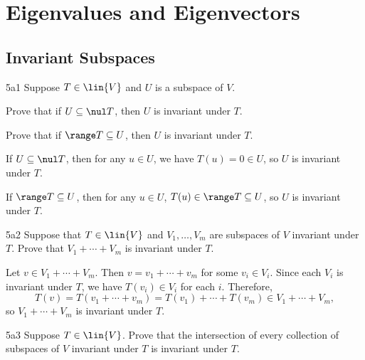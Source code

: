 \section{Eigenvalues and Eigenvectors}

\subsection{Invariant Subspaces}

\begin{exercise}{5a1}
    Suppose $T \in \lin{V}$ and $U$ is a subspace of $V$.
    \begin{subexercises}
        \item Prove that if $U \subseteq \nul T$, then $U$ is invariant under $T$.
        \item Prove that if $\range T \subseteq U$, then $U$ is invariant under $T$.
    \end{subexercises}
\end{exercise}

\begin{solenum}
    \item If $U \subseteq \nul T$, then for any $u \in U$, we have $T(u) = 0 \in U$, so $U$ is invariant under $T$.
    \item If $\range T \subseteq U$, then for any $u \in U$, $T(u) \in \range T \subseteq U$, so $U$ is invariant under $T$.
\end{solenum}

\begin{exercise}{5a2}
    Suppose that $T \in \lin{V}$ and $V_1, \ldots, V_m$ are subspaces of $V$ invariant under $T$.
	Prove that $V_1 + \cdots + V_m$ is invariant under $T$.
\end{exercise}

\begin{sol}
    Let $v \in V_1 + \cdots + V_m$.
	Then $v = v_1 + \cdots + v_m$ for some $v_i \in V_i$.
	Since each $V_i$ is invariant under $T$, we have $T(v_i) \in V_i$ for each $i$.
	Therefore,
    \[
    	T(v) = T(v_1 + \cdots + v_m) = T(v_1) + \cdots + T(v_m) \in V_1 + \cdots + V_m,
    \]
    so $V_1 + \cdots + V_m$ is invariant under $T$.
\end{sol}

\begin{exercise}{5a3}
    Suppose $T \in \lin{V}$.
	Prove that the intersection of every collection of subspaces of $V$ invariant under $T$ is invariant under $T$.
\end{exercise}

